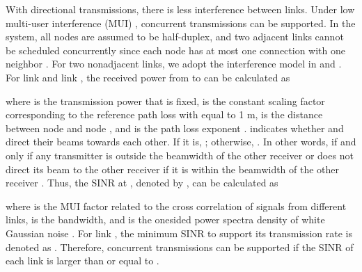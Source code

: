 \documentclass[journal]{IEEEtran}
\begin{document}
With directional transmissions, there is less interference between links. Under low multi-user
interference (MUI) \cite{Qiao}, concurrent transmissions can be supported. In the system, all nodes
are assumed to be half-duplex, and two adjacent links cannot be scheduled concurrently since each
node has at most one connection with one neighbor \cite{mao}. For two nonadjacent links, we adopt
the interference model in \cite{Qiao} and \cite{Xu_mis}. For link  and link ,
the received power from  to  can be calculated as

where  is the transmission power that is fixed,  is the constant
scaling factor corresponding to the reference path loss  with  equal to 1 m,
 is the distance between node  and node , and  is the path loss
exponent \cite{Qiao}.  indicates whether  and  direct their beams towards
each other. If it is, ; otherwise, . In other words,  if and only if any transmitter is outside
the beamwidth of the other receiver or does not
direct its beam to the other receiver if it is within
the beamwidth of the other receiver \cite{Qiao_D2D}. Thus, the SINR at ,
denoted by , can be calculated as

where  is the MUI factor related to the cross correlation of signals from different links,
 is the bandwidth, and  is the onesided
power spectra density of white Gaussian noise \cite{Qiao}. For link , the minimum SINR to support its transmission rate
 is denoted as . Therefore, concurrent transmissions can be
supported if the SINR of each link  is larger than or equal to .
\end{document}
